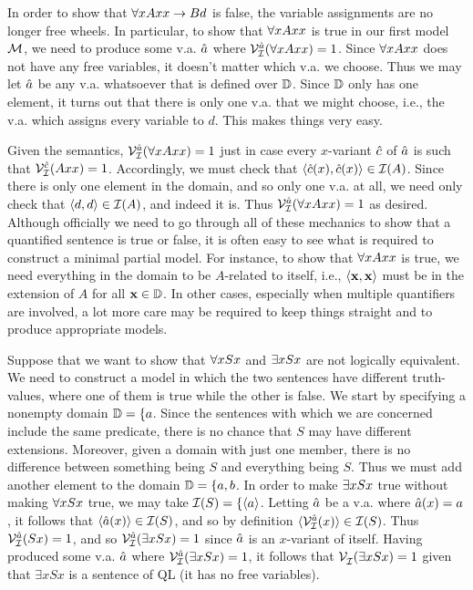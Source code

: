 In order to show that $\forall xAxx \rightarrow Bd$ is false, the variable assignments are no longer free wheels.
In particular, to show that $\forall xAxx$ is true in our first model $\mathcal{M}$, we need to produce some v.a. $\hat{a}$ where $\mathcal{V}_{\mathcal{I}}^{\hat{a}}(\forall xAxx)=1$.
Since $\forall xAxx$ does not have any free variables, it doesn't matter which v.a. we choose. 
Thus we may let $\hat{a}$ be any v.a. whatsoever that is defined over $\mathbb{D}$.
Since $\mathbb{D}$ only has one element, it turns out that there is only one v.a. that we might choose, i.e., the v.a. which assigns every variable to $d$.
This makes things very easy.

Given the semantics, $\mathcal{V}_{\mathcal{I}}^{\hat{a}}(\forall xAxx)=1$ just in case every $x$-variant $\hat{c}$ of $\hat{a}$ is such that $\mathcal{V}_{\mathcal{I}}^{\hat{c}}(Axx)=1$.
Accordingly, we must check that $\langle\hat{c}(x),\hat{c}(x)\rangle\in\mathcal{I}(A)$.
Since there is only one element in the domain, and so only one v.a. at all, we need only check that $\langle d,d\rangle\in\mathcal{I}(A)$, and indeed it is.
Thus $\mathcal{V}_{\mathcal{I}}^{\hat{a}}(\forall xAxx)=1$ as desired. 
Although officially we need to go through all of these mechanics to show that a quantified sentence is true or false, it is often easy to see what is required to construct a minimal partial model.
For instance, to show that $\forall xAxx$ is true, we need everything in the domain to be $A$-related to itself, i.e., $\langle\mathbf{x},\mathbf{x}\rangle$ must be in the extension of $A$ for all $\mathbf{x}\in\mathbb{D}$.
In other cases, especially when multiple quantifiers are involved, a lot more care may be required to keep things straight and to produce appropriate models.

Suppose that we want to show that $\forall x Sx$ and $\exists x Sx$ are not logically equivalent.
We need to construct a model in which the two sentences have different truth-values, where one of them is true while the other is false.
We start by specifying a nonempty domain $\mathbb{D}=\{a$.
Since the sentences with which we are concerned include the same predicate, there is no chance that $S$ may have different extensions. 
Moreover, given a domain with just one member, there is no difference between something being $S$ and everything being $S$.
Thus we must add another element to the domain $\mathbb{D}=\{a,b$.
In order to make $\exists x Sx$ true without making $\forall x Sx$ true, we may take $\mathcal{I}(S)=\{\langle a\rangle$.
Letting $\hat{a}$ be a v.a. where $\hat{a}(x)=a$, it follows that $\langle\hat{a}(x)\rangle\in\mathcal{I}(S)$, and so by definition $\langle\mathcal{V}_{\mathcal{I}}^{\hat{a}}(x)\rangle\in\mathcal{I}(S)$.
Thus $\mathcal{V}_{\mathcal{I}}^{\hat{a}}(Sx)=1$, and so $\mathcal{V}_{\mathcal{I}}^{\hat{a}}(\exists xSx)=1$ since $\hat{a}$ is an $x$-variant of itself.
Having produced some v.a. $\hat{a}$ where $\mathcal{V}_{\mathcal{I}}^{\hat{a}}(\exists xSx)=1$, it follows that $\mathcal{V}_{\mathcal{I}}^{}(\exists xSx)=1$ given that $\exists xSx$ is a sentence of QL (it has no free variables). 

